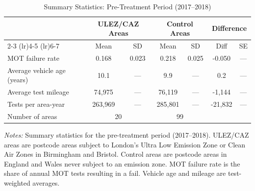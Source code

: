 \begin{table}[H]
\centering
\caption{Summary Statistics: Pre-Treatment Period (2017--2018)}
\label{tab:summary}
\begin{threeparttable}
\begin{tabular}{lcccccc}
\toprule
 & \multicolumn{2}{c}{ULEZ/CAZ Areas} & \multicolumn{2}{c}{Control Areas} & \multicolumn{2}{c}{Difference} \\
 \cmidrule(lr){2-3} \cmidrule(lr){4-5} \cmidrule(lr){6-7}
 & Mean & SD & Mean & SD & Diff & SE \\
\midrule
MOT failure rate & 0.168 & 0.023 & 0.218 & 0.025 & -0.050 & --- \\
Average vehicle age (years) & 10.1 & --- & 9.9 & --- & 0.2 & --- \\
Average test mileage & 74,975 & --- & 76,119 & --- & -1,144 & --- \\
Tests per area-year & 263,969 & --- & 285,801 & --- & -21,832 & --- \\
\midrule
Number of areas & \multicolumn{2}{c}{20} & \multicolumn{2}{c}{99} & & \\
\bottomrule
\end{tabular}
\begin{tablenotes}[flushleft]
\small
\item \textit{Notes:} Summary statistics for the pre-treatment period (2017--2018). ULEZ/CAZ areas are postcode areas subject to London's Ultra Low Emission Zone or Clean Air Zones in Birmingham and Bristol. Control areas are postcode areas in England and Wales never subject to an emission zone. MOT failure rate is the share of annual MOT tests resulting in a fail. Vehicle age and mileage are test-weighted averages.
\end{tablenotes}
\end{threeparttable}
\end{table}
